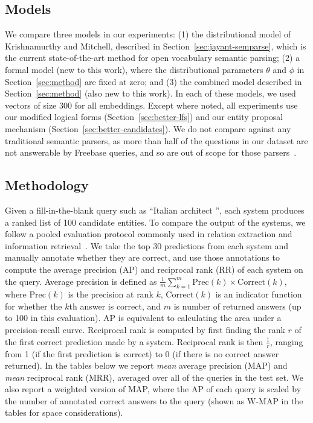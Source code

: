 \documentclass[11pt,letterpaper]{article}
\newcommand{\secref}[1]{Section~\ref{sec:#1}}
\newcommand{\blank}{\underline{\hspace{.5cm}}}
\begin{document}
\subsection{Models}

We compare three models in our experiments: (1) the distributional model of Krishnamurthy and
Mitchell, described in \secref{jayant-semparse}, which is the current state-of-the-art method for
open vocabulary semantic parsing; (2) a formal model (new to this work), where the distributional
parameters $\theta$ and $\phi$ in \secref{method} are fixed at zero; and (3) the combined model
described in \secref{method} (also new to this work).  In each of these models, we used vectors of
size 300 for all embeddings.  Except where noted, all experiments use our modified logical forms
(\secref{better-lfs}) and our entity proposal mechanism (\secref{better-candidates}).  We do not
compare against any traditional semantic parsers, as more than half of the questions in our dataset
are not answerable by Freebase queries, and so are out of scope for those
parsers~\cite{krishnamurthy-2015-semparse-open-vocabulary}.

\subsection{Methodology}

Given a fill-in-the-blank query such as ``Italian architect \blank{}'', each system produces a
ranked list of 100 candidate entities.  To compare the output of the systems, we follow a pooled
evaluation protocol commonly used in relation extraction and information
retrieval~\cite{west-2014-kbc-via-qa,riedel-2013-mf-universal-schema}.  We take the top 30
predictions from each system and manually annotate whether they are correct, and use those
annotations to compute the average precision (AP) and reciprocal rank (RR) of each system on the
query.  Average precision is defined as $\frac{1}{m}\sum^m_{k=1} \mathrm{Prec}(k) \times
\mathrm{Correct}(k)$, where $\mathrm{Prec}(k)$ is the precision at rank $k$, $\mathrm{Correct}(k)$
is an indicator function for whether the $k$th answer is correct, and $m$ is number of returned
answers (up to 100 in this evaluation).  AP is equivalent to calculating the area under a
precision-recall curve.  Reciprocal rank is computed by first finding the rank $r$ of the first
correct prediction made by a system.  Reciprocal rank is then $\frac{1}{r}$, ranging from 1 (if the
first prediction is correct) to 0 (if there is no correct answer returned).  In the tables below we
report \emph{mean} average precision (MAP) and \emph{mean} reciprocal rank (MRR), averaged over all
of the queries in the test set.  We also report a weighted version of MAP, where the AP of each
query is scaled by the number of annotated correct answers to the query (shown as W-MAP in the
tables for space considerations).
\end{document}
